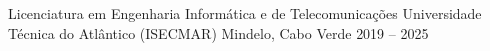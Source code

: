 
\begin{cventries}
  \cventry
    {Licenciatura em Engenharia Informática e de Telecomunicações}
    {Universidade Técnica do Atlântico (ISECMAR)}
    {Mindelo, Cabo Verde}
    {2019 -- 2025}
    {}
\end{cventries}
